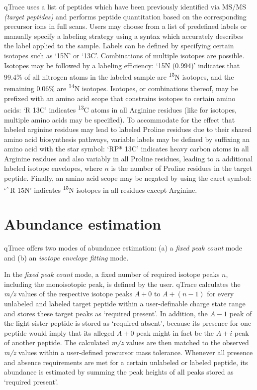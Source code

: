 qTrace uses a list of peptides which have been previously identified via MS/MS
{\em (target peptides)} and performs peptide quantitation based on the 
corresponding precursor ions in full scans.
Users may choose from a list of predefined labels or manually specify a 
labeling strategy using a syntax which accurately describes the label applied 
to the sample.
Labels can be defined by specifying certain isotopes such as `15N' or `13C'.
Combinations of multiple isotopes are possible. 
Isotopes may be followed by a labeling efficiency: `15N (0.994)'
indicates that 99.4\% of all nitrogen atoms in the labeled sample are 
\textsuperscript{15}N isotopes, and the remaining 0.06\% are 
\textsuperscript{14}N isotopes. 
Isotopes, or combinations thereof, may be prefixed with an 
amino acid scope that constrains isotopes to certain amino acids: 
`R 13C' indicates \textsuperscript{13}C atoms in all Arginine residues (like for 
isotopes, multiple amino acids may be specified). 
To accommodate for the effect that labeled arginine residues may lead 
to labeled Proline residues due to their shared amino acid biosynthesis pathways, 
variable labels may be defined by suffixing an amino acid with the star 
symbol: `RP* 13C' indicates heavy carbon atoms in all Arginine residues 
and also variably in all Proline residues, leading to $n$ additional labeled 
isotope envelopes, where $n$ is the number of Proline residues in the target peptide.
Finally, an amino acid scope may be negated by using the caret symbol: 
`$\caret$R 15N' indicates \textsuperscript{15}N isotopes in all residues 
except Arginine.

\section*{Abundance estimation}

qTrace offers two modes of abundance estimation: (a) a {\em fixed peak count} 
mode and (b) an {\em isotope envelope fitting} mode. 

In the {\em fixed peak count} mode, a fixed number of required isotope peaks $n$,
including the monoisotopic peak, is defined by the user.
qTrace calculates the {\em m/z} values of the respective isotope peaks 
\mbox{$A+0$} to $A+(n-1)$ for every unlabeled and labeled target peptide within 
a user-definable charge state range and stores these target peaks as 
`required present'. 
In addition, the $A-1$ peak of the light sister peptide is stored as 
`required absent', because its presence for one peptide would imply 
that its alleged $A+0$ peak might in fact be the $A+i$ peak of 
another peptide. 
The calculated {\em m/z} values are then matched to the observed {\em m/z} 
values within a user-defined precursor mass tolerance.
Whenever all presence and absence requirements are met for a certain unlabeled 
or labeled peptide, its abundance is estimated by summing the peak heights of 
all peaks stored as `required present'. 

